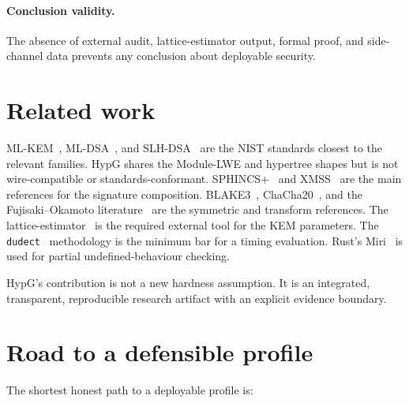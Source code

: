 \documentclass[runningheads]{llncs}
\begin{document}
\paragraph{Conclusion validity.}  The absence of external audit,
lattice-estimator output, formal proof, and side-channel data prevents
any conclusion about deployable security.

\section{Related work}
\label{sec:related}

ML-KEM~\cite{fips203}, ML-DSA~\cite{fips204}, and
SLH-DSA~\cite{fips205} are the NIST standards closest to the relevant
families.  HypG shares the Module-LWE and hypertree shapes but is not
wire-compatible or standards-conformant.  SPHINCS+~\cite{sphincs} and
XMSS~\cite{rfc8391} are the main references for the signature
composition.  BLAKE3~\cite{blake3}, ChaCha20~\cite{rfc8439}, and the
Fujisaki--Okamoto literature~\cite{fo99,hhk17} are the symmetric and
transform references.  The lattice-estimator~\cite{estimator} is the
required external tool for the KEM parameters.  The
\texttt{dudect}~\cite{dudect} methodology is the minimum bar for a
timing evaluation.  Rust's Miri~\cite{miri} is used for partial
undefined-behaviour checking.

HypG's contribution is not a new hardness assumption.  It is an
integrated, transparent, reproducible research artifact with an
explicit evidence boundary.

\section{Road to a defensible profile}
\label{sec:roadmap}

The shortest honest path to a deployable profile is:
\end{document}
